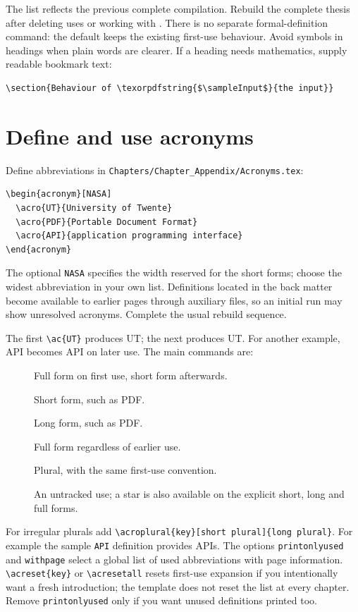 The list reflects the previous complete compilation. Rebuild the complete
thesis after deleting uses or working with \verb||. There is no
separate formal-definition command: the default keeps the existing first-use
behaviour. Avoid symbols in headings when plain words are clearer. If a heading
needs mathematics, supply readable bookmark text:
\begin{lstlisting}
\section{Behaviour of \texorpdfstring{$\sampleInput$}{the input}}
\end{lstlisting}

\section{Define and use acronyms}\label{sec:acronyms}
Define abbreviations in \texttt{Chapters/Chapter\_Appendix/Acronyms.tex}:
\begin{lstlisting}
\begin{acronym}[NASA]
  \acro{UT}{University of Twente}
  \acro{PDF}{Portable Document Format}
  \acro{API}{application programming interface}
\end{acronym}
\end{lstlisting}
The optional \texttt{NASA} specifies the width reserved for the short forms;
choose the widest abbreviation in your own list. Definitions located in the
back matter become available to earlier pages through auxiliary files, so an
initial run may show unresolved acronyms. Complete the usual rebuild sequence.

The first \verb|\ac{UT}| produces \ac{UT}; the next produces \ac{UT}.
For another example, \ac{API} becomes \ac{API} on later use. The main commands are:
\begin{description}
\item[\texttt{\string\ac\{key\}}] Full form on first use, short form afterwards.
\item[\texttt{\string\acs\{key\}}] Short form, such as \acs{PDF}.
\item[\texttt{\string\acl\{key\}}] Long form, such as \acl{PDF}.
\item[\texttt{\string\acf\{key\}}] Full form regardless of earlier use.
\item[\texttt{\string\acp\{key\}}] Plural, with the same first-use convention.
\item[\texttt{\string\ac*\{key\}}] An untracked use; a star is also available on
the explicit short, long and full forms.
\end{description}
For irregular plurals add \verb|\acroplural{key}[short plural]{long plural}|.
For example the sample \texttt{API} definition provides \acp{API}.
The options \texttt{printonlyused} and \texttt{withpage} select a global list of used
abbreviations with page information. \verb|\acreset{key}| or
\verb|\acresetall| resets first-use expansion if you intentionally want a fresh
introduction; the template does not reset the list at every chapter.
Remove \texttt{printonlyused} only if you want unused definitions printed too.

